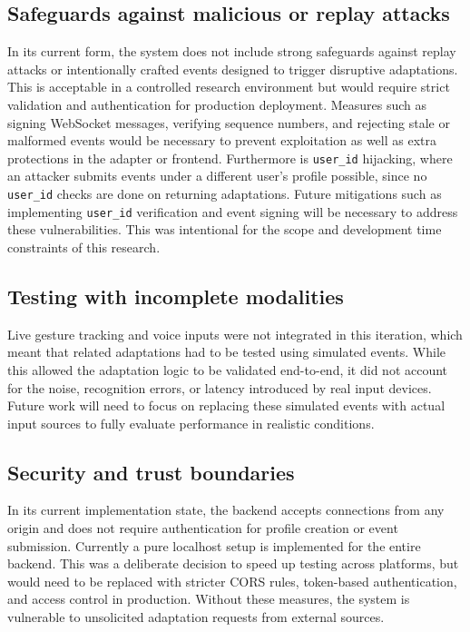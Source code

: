 \documentclass[openany]{book}
\begin{document}
\subsection{Safeguards against malicious or replay attacks}
In its current form, the system does not include strong safeguards against replay attacks or intentionally crafted events designed to trigger disruptive adaptations. This is acceptable in a controlled research environment but would require strict validation and authentication for production deployment. Measures such as signing WebSocket messages, verifying sequence numbers, and rejecting stale or malformed events would be necessary to prevent exploitation as well as extra protections in the adapter or frontend. Furthermore is \texttt{user\_id} hijacking, where an attacker submits events under a different user’s profile possible, since no \texttt{user\_id} checks are done on returning adaptations. Future mitigations such as implementing \texttt{user\_id} verification and event signing will be necessary to address these vulnerabilities. This was intentional for the scope and development time constraints of this research.

\subsection{Testing with incomplete modalities}
Live gesture tracking and voice inputs were not integrated in this iteration, which meant that related adaptations had to be tested using simulated events. While this allowed the adaptation logic to be validated end-to-end, it did not account for the noise, recognition errors, or latency introduced by real input devices. Future work will need to focus on replacing these simulated events with actual input sources to fully evaluate performance in realistic conditions.

\subsection{Security and trust boundaries}
In its current implementation state, the backend accepts connections from any origin and does not require authentication for profile creation or event submission. Currently a pure localhost setup is implemented for the entire backend. This was a deliberate decision to speed up testing across platforms, but would need to be replaced with stricter CORS rules, token-based authentication, and access control in production. Without these measures, the system is vulnerable to unsolicited adaptation requests from external sources.
\end{document}
